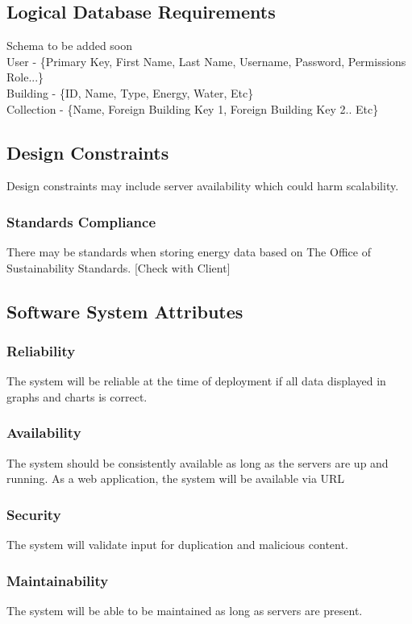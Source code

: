 \documentclass[onecolumn, draftclsnofoot,10pt, compsoc]{IEEEtran}
\begin{document}
    \subsection{Logical Database Requirements}
    Schema to be added soon\\
    User - \{Primary Key, First Name, Last Name, Username, Password, Permissions Role...\} \\ 
    Building - \{ID, Name, Type, Energy, Water, Etc\}\\
    Collection - \{Name, Foreign Building Key 1, Foreign Building Key 2.. Etc\}
    
    \subsection{Design Constraints}
    Design constraints may include server availability which could harm scalability.
    \subsubsection{Standards Compliance}
    There may be standards when storing energy data based on The Office of Sustainability Standards.
    [Check with Client]

    \subsection{Software System Attributes}
    
    \subsubsection{Reliability}
    The system will be reliable at the time of deployment if all data displayed in graphs and charts is correct.\\
    \subsubsection{Availability}
    The system should be consistently available as long as the servers are up and running. As a web application, the system will be available via URL 
    \subsubsection{Security}
    The system will validate input for duplication and malicious content.\\
    \subsubsection{Maintainability}
    The system will be able to be maintained as long as servers are present.
\end{document}
